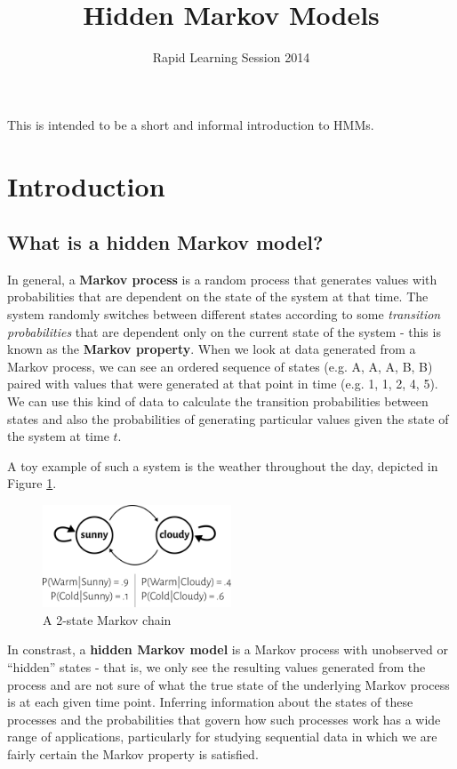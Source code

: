 \documentclass[11pt, oneside]{article}
\title{Hidden Markov Models}
\author{Rapid Learning Session 2014}
\date{}
\begin{document}
\maketitle

This is intended to be a short and informal introduction to HMMs.

\section{Introduction}
\subsection{What is a hidden Markov model?}
In general, a \textbf{Markov process} is a random process that generates values with probabilities that are dependent on the state of the system at that time. The system randomly switches between different states according to some \textit{transition probabilities} that are dependent only on the current state of the system - this is known as the \textbf{Markov property}. When we look at data generated from a Markov process, we can see an ordered sequence of states (e.g. A, A, A, B, B) paired with values that were generated at that point in time (e.g. 1, 1, 2, 4, 5). We can use this kind of data to calculate the transition probabilities between states and also the probabilities of generating particular values given the state of the system at time $t$.

A toy example of such a system is the weather throughout the day, depicted in Figure \ref{fig:simple}. 
\begin{figure}[H]
\label{fig:simple}
\centering
\includegraphics[width=0.5\textwidth]{../figures/g5016.png}
\caption{A 2-state Markov chain}
\end{figure}



In constrast, a \textbf{hidden Markov model} is a Markov process with unobserved or ``hidden'' states - that is, we only see the resulting values generated from the process and are not sure of what the true state of the underlying Markov process is at each given time point. Inferring information about the states of these processes and the probabilities that govern how such processes work has a wide range of applications, particularly for studying sequential data in which we are fairly certain the Markov property is satisfied.
\end{document}

